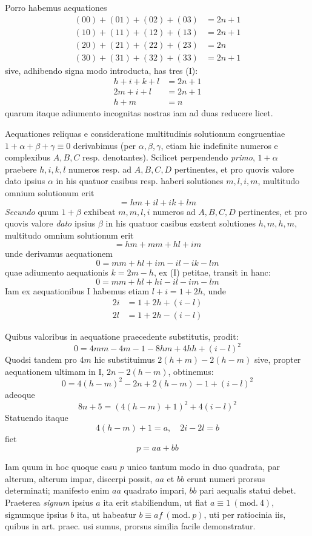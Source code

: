 %
Porro habemus aequationes
\[
\begin{aligned}
(00)+(01)+(02)+(03)&=2n+1\\
(10)+(11)+(12)+(13)&=2n+1\\
(20)+(21)+(22)+(23)&=2n\\
(30)+(31)+(32)+(33)&=2n+1
\end{aligned}
\]
sive, adhibendo signa modo introducta, has tres (I):
\[
\begin{aligned}
h+i+k+l&=2n+1\\
2m+i+l&=2n+1\\
h+m&=n
\end{aligned}
\]
quarum itaque adiumento incognitas nostras iam ad duas reducere licet.

Aequationes reliquas e consideratione multitudinis solutionum congruentiae $1+\alpha+\beta+\gamma\equiv0$ derivabimus (per $\alpha,\beta,\gamma$, etiam hic indefinite numeros e complexibus $A,B,C$ resp. denotantes). Scilicet perpendendo \emph{primo}, $1+\alpha$ praebere $h,i,k,l$ numeros resp. ad $A,B,C,D$ pertinentes, et pro quovis valore dato ipsius $\alpha$ in his quatuor casibus resp. haberi solutiones $m,l,i,m$, multitudo omnium solutionum erit
\[
=hm+il+ik+lm
\]
\emph{Secundo} quum $1+\beta$ exhibeat $m,m,l,i$ numeros ad $A,B,C,D$ pertinentes, et pro quovis valore \emph{dato} ipsius $\beta$ in his quatuor casibus exstent solutiones $h,m,h,m$, multitudo omnium solutionum erit
\[
=hm+mm+hl+im
\]
unde derivamus aequationem
\[
0=mm+hl+im-il-ik-lm
\]
quae adiumento aequationis $k=2m-h$, ex (I) petitae, transit in hanc:
\[
0=mm+hl+hi-il-im-lm
\]
Iam ex aequationibus I habemus etiam $l+i=1+2h$, unde
\[
\begin{aligned}
2i&=1+2h+(i-l)\\
2l&=1+2h-(i-l)
\end{aligned}
\]

%
Quibus valoribus in aequatione praecedente substitutis, prodit:
\[
0=4mm-4m-1-8hm+4hh+(i-l)^2
\]
Quodsi tandem pro $4m$ hic substituimus $2(h+m)-2(h-m)$ sive, propter aequationem ultimam in I, $2n-2(h-m)$, obtinemus:
\[
0=4(h-m)^2-2n+2(h-m)-1+(i-l)^2
\]
adeoque
\[
8n+5=(4(h-m)+1)^2+4(i-l)^2
\]
Statuendo itaque
\[
4(h-m)+1=a,\quad2i-2l=b
\]
fiet
\[
p=aa+bb
\]

Iam quum in hoc quoque casu $p$ unico tantum modo in duo quadrata, par alterum, alterum impar, discerpi possit, $aa$ et $bb$ erunt numeri prorsus determinati; manifesto enim $aa$ quadrato impari, $bb$ pari aequalis statui debet. Praeterea \emph{signum} ipsius $a$ ita erit stabiliendum, ut fiat $a\equiv1\ (\mathrm{mod.}\ 4)$, signumque ipsius $b$ ita, ut habeatur $b\equiv af\ (\mathrm{mod.}\ p)$, uti per ratiocinia iis, quibus in art. praec. usi sumus, prorsus similia facile demonstratur.

